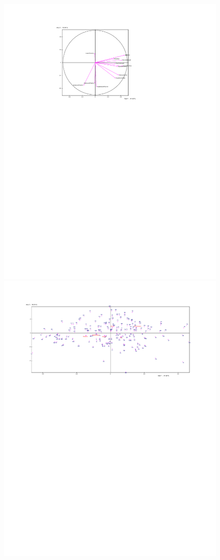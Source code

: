 \documentclass[a4paper,10pt,twocolumn]{article}
\begin{document}
\begin{figure}[!ht]
\begin{center}
\includegraphics[width=16cm]{p5a.pdf}
\includegraphics[width=17cm]{p5b.pdf}

\end{center}
\end{figure}
\end{document}

